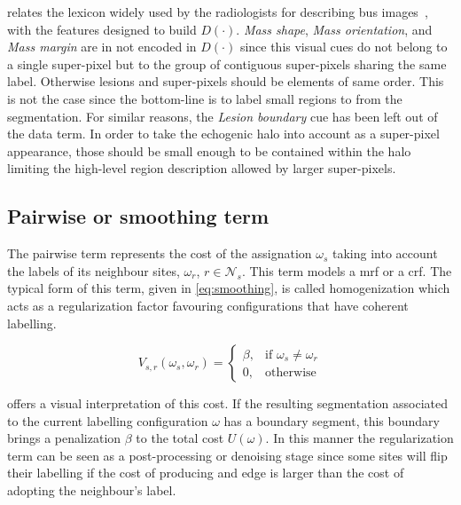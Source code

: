  relates the lexicon widely used by the radiologists for describing \ac{bus} images~\cite{biradsus}, with the features designed to build $D(\cdot)$.
\emph{Mass shape}, \emph{Mass orientation}, and \emph{Mass margin} are in not encoded in $D(\cdot)$ since this visual cues do not belong to a single super-pixel but to the group of contiguous super-pixels sharing the same label. 
Otherwise lesions and super-pixels should be elements of same order.
This is not the case since the bottom-line is to label small regions to from the segmentation.
For similar reasons, the \emph{Lesion boundary} cue has been left out of the data term.
In order to take the echogenic halo into account as a super-pixel appearance, those should be small enough to be contained within the halo limiting the high-level region description allowed by larger super-pixels.




\subsection{Pairwise or smoothing term} \label{sec:method:mrfTerm}
 
The pairwise term represents the cost of the assignation $\omega_s$ taking into account the labels of its neighbour sites, $\omega_r$, $r \in \mathcal{N}_{s}$. 
This term models a \ac{mrf} or a \ac{crf}.
The typical form of this term, given in \cref{eq:smoothing}, is called homogenization which acts as a regularization factor favouring configurations that have coherent labelling.

\begin{equation}
V_{s,r}(\omega_s,\omega_r) = 
\begin{cases}
    \beta, & \text{if } \omega_s \ne \omega_r\\
    0,              & \text{otherwise}
\end{cases}
\label{eq:smoothing}
\end{equation}

 offers a visual interpretation of this cost.
If the resulting segmentation associated to the current labelling configuration $\omega$ has a boundary segment, this boundary brings a penalization $\beta$ to the total cost $U(\omega)$.
In this manner the regularization term can be seen as a post-processing or denoising stage since some sites will flip their labelling if the cost of producing and edge is larger than the cost of adopting the neighbour's label. 

